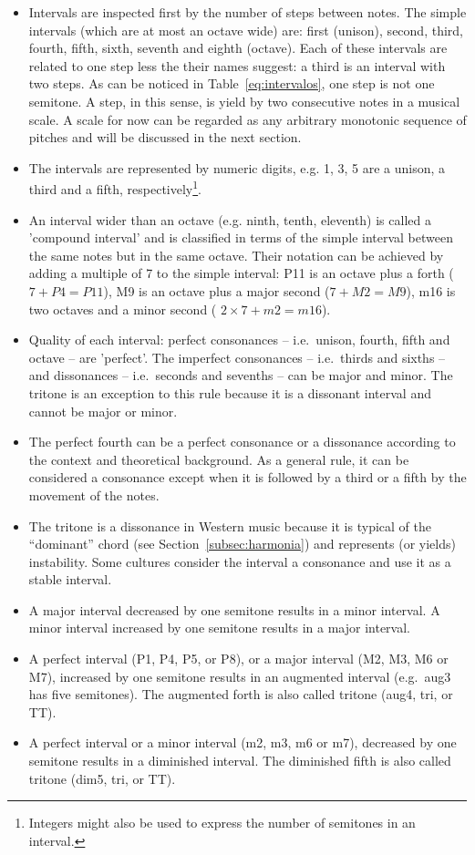 \begin{itemize}
    \item Intervals are inspected first by the number of steps between notes. The simple intervals (which are at most an octave wide) are: first (unison), second, third, fourth, fifth, sixth, seventh and eighth (octave).
		Each of these intervals are related to one step less the their names suggest: a third is an interval with two steps.
		As can be noticed in Table~\ref{eq:intervalos}, one step is not one semitone.
		A step, in this sense, is yield by two consecutive notes in a musical scale.
		A scale for now can be regarded as any arbitrary monotonic sequence of pitches and will be discussed in the next section.
            \item The intervals are represented by numeric digits, e.g. 1, 3, 5 are a unison, a third and a fifth, respectively\footnote{Integers might also be used to express the number of semitones in an interval.}.
	\item An interval wider than an octave (e.g. ninth, tenth, eleventh) is called a 'compound interval' and is classified in terms of the simple interval between the same notes but in the same octave. Their notation can be achieved by adding a multiple of
                7 to the simple interval: P11 is an octave plus a forth ($7 + P4 = P11$), M9 is an octave plus a major second ($7 + M2 = M9$),
                m16 is two octaves and a minor second ( $2\times 7 + m2 = m16$).
	\item Quality of each interval: perfect consonances --
                i.e.\ unison, fourth, fifth and octave -- are 'perfect'. The imperfect consonances -- i.e.\ thirds and sixths -- and dissonances -- i.e.\ seconds and sevenths -- can be major and minor. The tritone is an exception to this rule because it is a dissonant interval and cannot be major or minor.
	\item The perfect fourth can be a perfect consonance or a dissonance according to the context and theoretical background. As a general rule, it can be considered a consonance except when it is followed by a third or a fifth by the movement of the notes.
	\item The tritone is a dissonance in Western music because
		it is typical of the ``dominant'' chord (see Section~\ref{subsec:harmonia}) and represents (or yields) instability.
                Some cultures consider the interval a consonance and use it as a stable interval.
	\item A major interval decreased by one semitone results in a minor interval. A minor interval increased by one semitone results in a major interval.
	\item A perfect interval (P1, P4, P5, or P8), or a major interval (M2, M3, M6 or M7), increased
by one semitone results in an augmented interval (e.g.\
aug3 has five semitones). The augmented forth
is also called tritone (aug4, tri, or TT).
	\item A perfect interval or a minor interval (m2, m3, m6 or m7), decreased by one semitone results in a diminished interval. The
diminished fifth is also called tritone (dim5, tri, or TT).


\end{itemize}
